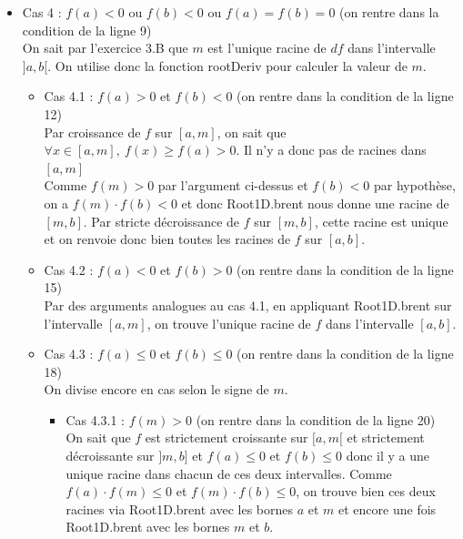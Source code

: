 \documentclass[a4paper, 12pt]{article}
\begin{document}
\begin{itemize}
    \item Cas 4 : \( f(a) < 0 \) ou \( f(b) < 0 \) ou \( f(a) = f(b) = 0 \) \quad (on rentre dans la condition de la ligne 9) \\
On sait par l'exercice 3.B que \( m \) est l'unique racine de \( df \) dans l'intervalle \( ]a, b[ \). On utilise donc la fonction rootDeriv pour calculer la valeur de \( m \).

    \begin{itemize}
    
        \item Cas 4.1 : \( f(a) > 0 \) et \( f(b) < 0 \) \quad (on rentre dans la condition de la ligne 12) \\
Par croissance de \( f \) sur \( [a, m] \), on sait que \( \forall x \in [a, m],~ f(x) \geq f(a) > 0 \). Il n'y a donc pas de racines dans \( [a, m] \) \\
Comme \( f(m) > 0 \) par l'argument ci-dessus et \( f(b) < 0 \) par hypothèse, on a \( f(m) \cdot f(b) < 0 \) et donc Root1D.brent nous donne une racine de \( [m, b] \). Par stricte décroissance de \( f \) sur \( [m, b] \), cette racine est unique et on renvoie donc bien toutes les racines de \( f \) sur \( [a, b] \).

        \item Cas 4.2 : \( f(a) < 0 \) et \( f(b) > 0 \) \quad (on rentre dans la condition de la ligne 15) \\
Par des arguments analogues au cas 4.1, en appliquant Root1D.brent sur l'intervalle \( [a, m] \), on trouve l'unique racine de \( f \) dans l'intervalle \( [a, b] \).

        \item Cas 4.3 : \( f(a) \leq 0 \) et \( f(b) \leq 0 \) \quad (on rentre dans la condition de la ligne 18) \\
On divise encore en cas selon le signe de \( m \).

        \begin{itemize}
        
            \item Cas 4.3.1 : \( f(m) > 0 \) \quad (on rentre dans la condition de la ligne 20) \\
On sait que \( f \) est strictement croissante sur \( [a, m[ \) et strictement décroissante sur \( ]m, b] \) et \( f(a) \leq 0 \) et \( f(b) \leq 0 \) donc il y a une unique racine dans chacun de ces deux intervalles. Comme \( f(a) \cdot f(m) \leq 0 \) et \( f(m) \cdot f(b) \leq 0 \), on trouve bien ces deux racines via Root1D.brent avec les bornes \( a \) et \( m \) et encore une fois Root1D.brent avec les bornes \( m \) et \( b \).
            

\end{itemize}
\end{itemize}
\end{itemize}
\end{document}
